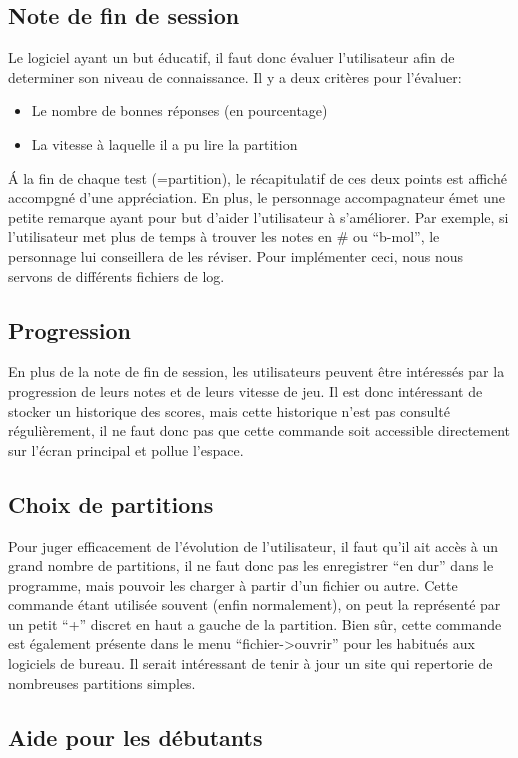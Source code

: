 \documentclass{article}
\begin{document}
\subsection{Note de fin de session}
Le logiciel ayant un but éducatif, il faut donc évaluer l'utilisateur afin de determiner son niveau de connaissance.
Il y a deux critères pour l'évaluer:
\begin{itemize}
 \item Le nombre de bonnes réponses (en pourcentage)
 \item La vitesse à laquelle il a pu lire la partition
\end{itemize}
\'A la fin de chaque test (=partition), le récapitulatif de ces deux points est affiché accompgné d'une appréciation.
En plus, le personnage accompagnateur émet une petite remarque ayant pour but d'aider l'utilisateur à s'améliorer.
Par exemple, si l'utilisateur met plus de temps à trouver les notes en \# ou ``b-mol'', le personnage lui conseillera de les réviser.
Pour implémenter ceci, nous nous servons de différents fichiers de log.
\subsection{Progression}
En plus de la note de fin de session, les utilisateurs peuvent être intéressés par la progression de leurs notes et de leurs vitesse
de jeu. Il est donc intéressant de stocker un historique des scores, mais cette historique n'est pas consulté régulièrement, il ne 
faut donc pas que cette commande soit accessible directement sur l'écran principal et pollue l'espace.
\subsection{Choix de partitions}
Pour juger efficacement de l'évolution de l'utilisateur, il faut qu'il ait accès à un grand nombre de partitions, il ne faut donc 
pas les enregistrer ``en dur'' dans le programme, mais pouvoir les charger à partir d'un fichier ou autre. Cette commande étant utilisée
 souvent (enfin normalement), on peut la représenté par un petit ``+'' discret en haut a gauche de la partition.
 Bien sûr, cette commande est également présente dans le menu ``fichier->ouvrir'' pour les habitués aux logiciels de bureau.
 Il serait intéressant de tenir à jour un site qui repertorie de nombreuses partitions simples.
\subsection{Aide pour les débutants}
\end{document}
